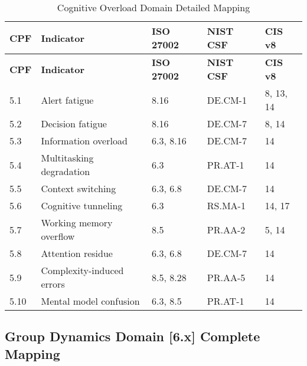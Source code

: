 \documentclass[11pt,a4paper]{article}
\begin{document}
\begin{longtable}{p{1cm}p{4cm}p{2.5cm}p{2.5cm}p{2cm}}
\caption{Cognitive Overload Domain Detailed Mapping} \\
\toprule
\textbf{CPF} & \textbf{Indicator} & \textbf{ISO 27002} & \textbf{NIST CSF} & \textbf{CIS v8} \\
\midrule
\endfirsthead
\toprule
\textbf{CPF} & \textbf{Indicator} & \textbf{ISO 27002} & \textbf{NIST CSF} & \textbf{CIS v8} \\
\midrule
\endhead
\bottomrule
\endlastfoot

5.1 & Alert fatigue & 8.16 & DE.CM-1 & 8, 13, 14 \\
5.2 & Decision fatigue & 8.16 & DE.CM-7 & 8, 14 \\
5.3 & Information overload & 6.3, 8.16 & DE.CM-7 & 14 \\
5.4 & Multitasking degradation & 6.3 & PR.AT-1 & 14 \\
5.5 & Context switching & 6.3, 6.8 & DE.CM-7 & 14 \\
5.6 & Cognitive tunneling & 6.3 & RS.MA-1 & 14, 17 \\
5.7 & Working memory overflow & 8.5 & PR.AA-2 & 5, 14 \\
5.8 & Attention residue & 6.3, 6.8 & DE.CM-7 & 14 \\
5.9 & Complexity-induced errors & 8.5, 8.28 & PR.AA-5 & 14 \\
5.10 & Mental model confusion & 6.3, 8.5 & PR.AT-1 & 14 \\

\end{longtable}

\subsection{Group Dynamics Domain [6.x] Complete Mapping}
\end{document}
